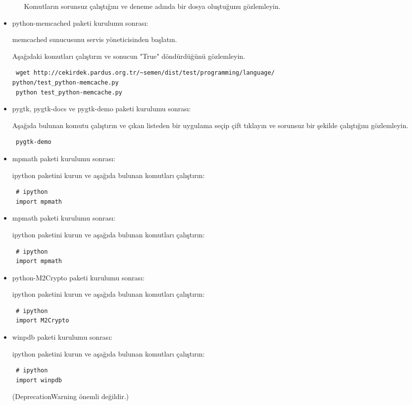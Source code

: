 \documentclass[a4paper,10pt]{article}
\begin{document}
\begin{itemize}
\begin{itemize}
Komutların sorunsuz çalıştığını ve deneme adında bir dosya oluştuğunu gözlemleyin.
\end{itemize}

\item python-memcached paketi kurulumu sonrası:

memcached sunucusunu servis yöneticisinden başlatın.

Aşağıdaki komutları çalıştırın ve sonucun "True" döndürdüğünü gözlemleyin.
\begin{verbatim}
 wget http://cekirdek.pardus.org.tr/~semen/dist/test/programming/language/
python/test_python-memcache.py
 python test_python-memcache.py
\end{verbatim}

\item pygtk, pygtk-docs ve pygtk-demo paketi kurulumu sonrası: 

Aşağıda bulunan komutu çalıştırın ve çıkan listeden bir uygulama seçip çift tıklayın ve sorunsuz bir şekilde çalıştığını gözlemleyin.
\begin{verbatim}
 pygtk-demo
\end{verbatim}


\item mpmath paketi kurulumu sonrası:  

ipython paketini kurun ve aşağıda bulunan komutları çalıştırın:
\begin{verbatim}
 # ipython
 import mpmath
\end{verbatim}

\item mpmath paketi kurulumu sonrası:  

ipython paketini kurun ve aşağıda bulunan komutları çalıştırın:
\begin{verbatim}
 # ipython
 import mpmath
\end{verbatim}

\item python-M2Crypto paketi kurulumu sonrası:

ipython paketini kurun ve aşağıda bulunan komutları çalıştırın:
\begin{verbatim}
 # ipython
 import M2Crypto
\end{verbatim}

\item winpdb paketi kurulumu sonrası:

ipython paketini kurun ve aşağıda bulunan komutları çalıştırın:
\begin{verbatim}
 # ipython
 import winpdb
\end{verbatim}
(DeprecationWarning önemli değildir.)


\end{itemize}
\end{document}
